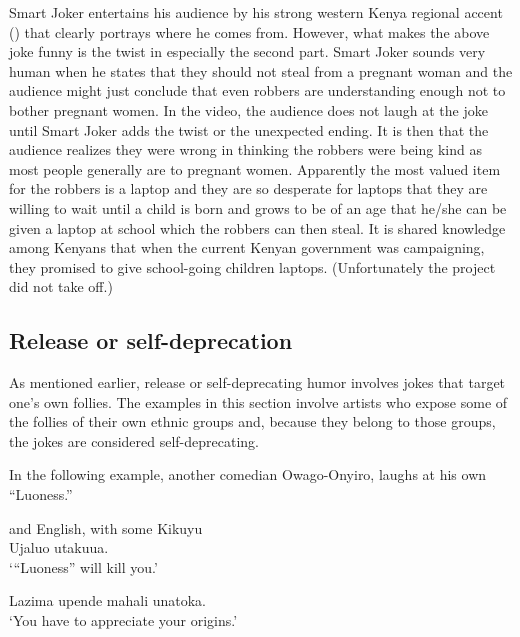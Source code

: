 \documentclass[output=paper]{langsci/langscibook}
\begin{document}
Smart Joker entertains his audience by his strong western Kenya  regional accent () that clearly portrays where he comes from. However, what makes the above joke funny is the twist in especially the second part. Smart Joker sounds very human when he states that they should not steal from a pregnant woman and the audience might just conclude that even robbers are understanding enough not to bother pregnant women. In the video, the audience does not laugh at the joke until Smart Joker adds the twist or the unexpected ending. It is then that the audience realizes they were wrong in thinking the robbers were being kind as most people generally are to pregnant women. Apparently the most valued item for the robbers is a laptop and they are so desperate for laptops that they are willing to wait until a child is born and grows to be of an age that he/she can be given a laptop at school which the robbers can then steal. It is shared knowledge among Kenyans that when the current Kenyan government was campaigning, they promised to give school-going children laptops. (Unfortunately the project did not take off.) 

\subsection{Release or self-deprecation}

As mentioned earlier, release or self-deprecating humor involves jokes that target one’s own follies. The examples in this section involve artists who expose some of the follies of their own ethnic groups and, because they belong to those groups, the jokes are considered self-deprecating. 

In the following example, another comedian Owago-Onyiro, laughs at his own “Luoness.”

\ea\label{ex:muaka:10}
{ and English, with some Kikuyu}\\
\smallskip
\ea   Ujaluo utakuua.\\
\glt ‘“Luoness” will kill you.’

\ex
 Lazima upende mahali unatoka.\\
\glt ‘You have to appreciate your origins.’ 
\end{document}
